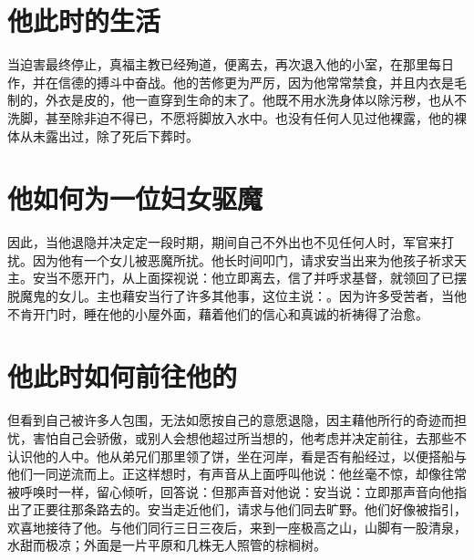 
\section{他此时的生活}

当迫害最终停止，真福主教已经殉道，便离去，再次退入他的小室，在那里每日作，并在信德的搏斗中奋战。他的苦修更为严厉，因为他常常禁食，并且内衣是毛制的，外衣是皮的，他一直穿到生命的末了。他既不用水洗身体以除污秽，也从不洗脚，甚至除非迫不得已，不愿将脚放入水中。也没有任何人见过他裸露，他的裸体从未露出过，除了死后下葬时。\par


\section{他如何为一位妇女驱魔}

因此，当他退隐并决定定一段时期，期间自己不外出也不见任何人时，军官来打扰。因为他有一个女儿被恶魔所扰。他长时间叩门，请求安当出来为他孩子祈求天主。安当不愿开门，从上面探视说：他立即离去，信了并呼求基督，就领回了已摆脱魔鬼的女儿。主也藉安当行了许多其他事，这位主说：。因为许多受苦者，当他不肯开门时，睡在他的小屋外面，藉着他们的信心和真诚的祈祷得了治愈。\par


\section{他此时如何前往他的}

但看到自己被许多人包围，无法如愿按自己的意愿退隐，因主藉他所行的奇迹而担忧，害怕自己会骄傲，或别人会想他超过所当想的，他考虑并决定前往，去那些不认识他的人中。他从弟兄们那里领了饼，坐在河岸，看是否有船经过，以便搭船与他们一同逆流而上。正这样想时，有声音从上面呼叫他说：他丝毫不惊，却像往常被呼唤时一样，留心倾听，回答说：但那声音对他说：安当说：立即那声音向他指出了正要往那条路去的。安当走近他们，请求与他们同去旷野。他们好像被指引，欢喜地接待了他。与他们同行三日三夜后，来到一座极高之山，山脚有一股清泉，水甜而极凉；外面是一片平原和几株无人照管的棕榈树。\par

